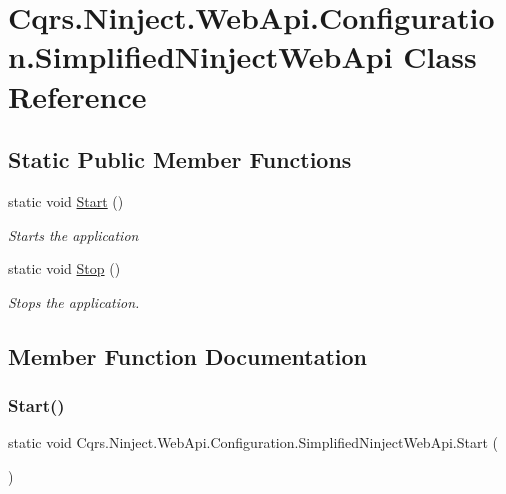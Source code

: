 \hypertarget{classCqrs_1_1Ninject_1_1WebApi_1_1Configuration_1_1SimplifiedNinjectWebApi}{}\section{Cqrs.\+Ninject.\+Web\+Api.\+Configuration.\+Simplified\+Ninject\+Web\+Api Class Reference}
\label{classCqrs_1_1Ninject_1_1WebApi_1_1Configuration_1_1SimplifiedNinjectWebApi}
\subsection*{Static Public Member Functions}
\begin{DoxyCompactItemize}
\item 
static void \hyperlink{classCqrs_1_1Ninject_1_1WebApi_1_1Configuration_1_1SimplifiedNinjectWebApi_a7da23980ac13618949a389c0beac6e89}{Start} ()
\begin{DoxyCompactList}\small\item\em Starts the application \end{DoxyCompactList}\item 
static void \hyperlink{classCqrs_1_1Ninject_1_1WebApi_1_1Configuration_1_1SimplifiedNinjectWebApi_a28327d1df27e02f828b52bb44319816d}{Stop} ()
\begin{DoxyCompactList}\small\item\em Stops the application. \end{DoxyCompactList}\end{DoxyCompactItemize}


\subsection{Member Function Documentation}
\mbox{\label{classCqrs_1_1Ninject_1_1WebApi_1_1Configuration_1_1SimplifiedNinjectWebApi_a7da23980ac13618949a389c0beac6e89}} 
\subsubsection{\texorpdfstring{Start()}{Start()}}
{\footnotesize\ttfamily static void Cqrs.\+Ninject.\+Web\+Api.\+Configuration.\+Simplified\+Ninject\+Web\+Api.\+Start (\begin{DoxyParamCaption}{ }\end{DoxyParamCaption})\hspace{0.3cm}{\ttfamily [static]}}



